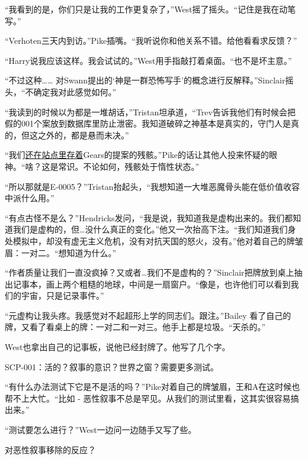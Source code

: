 “我看到的是，你们只是让我的工作更复杂了，”West摇了摇头。“记住是我在动笔写。”

“Verhoten三天内到访。”Pike插嘴。“我听说你和他关系不错。给他看看求反馈？”

“Harry说我应该这样。我会试试的。”West用手指敲打着桌面。“也不是坏主意。”

“不过这种…… 对Swann提出的‘神是一群恐怖写手’的概念进行反解释。”Sinclair摇头，“不确定我对此感觉如何。”

“我读到的时候以为都是一堆胡话，”Tristan坦承道，“Trev告诉我他们有时候会把假的001个案放到数据库里防止泄密。我知道破碎之神基本是真实的，守门人是真的，但这之外的，都是悬而未决。”

“我们\hyperref[chap:]{还在站点里存着}Gears的提案的残骸。”Pike的话让其他人投来怀疑的眼神。“啥？这是常识。不论如何，残骸处于惰性状态。”

“所以那就是E-0005？”Tristan抬起头，“我想知道一大堆恶魔骨头能在低价值收容中派什么用。”

“有点古怪不是么？”Hendricks发问，“我是说，我知道我是虚构出来的。我们都知道我们是虚构的，但…没什么真正的变化。”他又一次抬高下注。“我们知道我们身处模拟中，却没有虚无主义危机，没有对抗天国的怒火，没有。”他对着自己的牌皱眉：一对二。“想知道为什么。”

“作者质量让我们一直没疯掉？又或者…我们不是虚构的？”Sinclair把牌放到桌上抽出记事本，画上两个粗糙的地球，中间是一扇窗户。“像是，也许他们可以看到我们的宇宙，只是记录事件。”

“元虚构让我头疼。我感觉对不起超形上学的同志们。跟注。”Bailey 看了自己的牌，又看了看桌上的牌：一对二和一对三。他手上都是垃圾。“天杀的。”

West也拿出自己的记事板，说他已经封牌了。他写了几个字。

\begin{scpbox}

SCP-001：活的？叙事的意识？世界之窗？需要更多测试。

\end{scpbox}

“有什么办法测试下它是不是活的吗？”Pike对着自己的牌皱眉，王和A在这时候也帮不上大忙。“比如 - 恶性叙事不总是罕见。从我们的测试里看，这其实很容易搞出来。”

“测试要怎么进行？”West一边问一边随手又写了些。

\begin{scpbox}

对恶性叙事移除的反应？

\end{scpbox}

